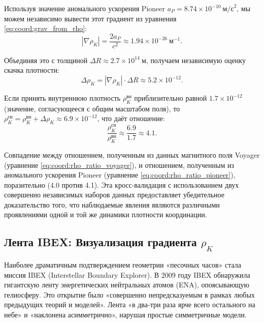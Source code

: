 \documentclass[12pt,a4paper]{article}
\theoremstyle{remark}
\begin{document}
	Используя значение аномального ускорения Pioneer $a_P = 8.74 \times 10^{-10}\ \text{м/с}^2$, мы можем независимо вывести этот градиент из уравнения \eqref{eq:coord:grav_from_rho}:
	\begin{equation}
		|\nabla \rho_K| = \frac{2a_P}{c^2} \approx 1.94 \times 10^{-26}\ \text{м}^{-1}.
		\label{eq:coord:gradient_pioneer}
	\end{equation}
	
	Объединяя это с толщиной $\Delta R \approx 2.7 \times 10^{14}\ \text{м}$, получаем независимую оценку скачка плотности:
	\begin{equation}
		\Delta \rho_K = |\nabla \rho_K| \cdot \Delta R \approx 5.2 \times 10^{-12}.
		\label{eq:coord:delta_rho_pioneer}
	\end{equation}
	
	Если принять внутреннюю плотность $\rho_K^{\text{вн}}$ приблизительно равной $1.7 \times 10^{-12}$ (значение, согласующееся с общим масштабом поля), то $\rho_K^{\text{сн}} = \rho_K^{\text{вн}} + \Delta \rho_K \approx 6.9 \times 10^{-12}$, что даёт отношение:
	\begin{equation}
		\frac{\rho_K^{\text{сн}}}{\rho_K^{\text{вн}}} \approx \frac{6.9}{1.7} \approx 4.1.
		\label{eq:coord:rho_ratio_pioneer}
	\end{equation}
	
	Совпадение между отношением, полученным из данных магнитного поля Voyager (уравнение \eqref{eq:coord:rho_ratio_voyager}), и отношением, полученным из аномального ускорения Pioneer (уравнение \eqref{eq:coord:rho_ratio_pioneer}), поразительно (4.0 против 4.1). Эта кросс-валидация с использованием двух совершенно независимых наборов данных предоставляет убедительное доказательство того, что наблюдаемые явления являются различными проявлениями одной и той же динамики плотности координации.
	
	\subsection{Лента IBEX: Визуализация градиента $\rho_K$}
	\label{subsec:coord:ibex}
	
	Наиболее драматичным подтверждением геометрии «песочных часов» стала миссия IBEX (Interstellar Boundary Explorer). В 2009 году IBEX обнаружила гигантскую ленту энергетических нейтральных атомов (ENA), опоясывающую гелиосферу. Это открытие было «совершенно непредсказуемым в рамках любых предыдущих теорий и моделей». Лента «в два-три раза ярче всего остального на небе» и «наклонена асимметрично», нарушая простые симметричные модели.
	
\end{document}
